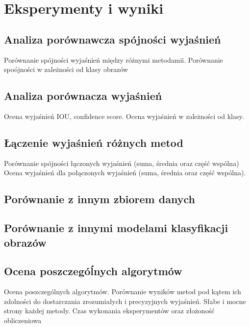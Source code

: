 
\chapter*{Eksperymenty i wyniki}

\section*{Analiza porównawcza spójności wyjaśnień}
Porównanie spójności wyjaśnień między różnymi metodamii.
Porównanie spoójności w zależności od klasy obrazów

\section*{Analiza porównacza wyjaśnień}
Ocena wyjaśnień IOU, confidence score.
Ocena wyjaśnień w zależności od klasy.

\section*{Łączenie wyjaśnień różnych metod}
Porównanie spójności łączonych wyjaśnień (suma, średnia oraz część wspólna)
Ocena wyjaśnień dla połączonych wyjaśnień (suma, średnia oraz część wspólna).

\section*{Porównanie z innym zbiorem danych}

\section*{Porównanie z innymi modelami klasyfikacji obrazów}

\section*{Ocena poszczegóĺnych algorytmów}
Ocena poszczególnych algorytmów.
Porównanie wyników metod pod kątem ich zdolności do dostarczania zrozumiałych i precyzyjnych wyjaśnień.
Słabe i mocne strony każdej metody.
Czas wykonania eksperymentów oraz złożoność obliczeniowa

